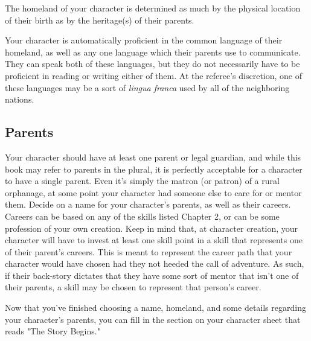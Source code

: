 \documentclass[oneside]{book}
\begin{document}
\begin{multicols}{2}
The homeland of your character is determined as much by the physical location of their birth as by the heritage(s) of their parents. 

Your character is automatically proficient in the common language of their homeland, as well as any one language which their parents use to communicate. They can speak both of these languages, but they do not necessarily have to be proficient in reading or writing either of them. At the referee's discretion, one of these languages may be a sort of \emph{lingua franca} used by all of the neighboring nations. 

\subsection{Parents}
Your character should have at least one parent or legal guardian, and while this book may refer to parents in the plural, it is perfectly acceptable for a character to have a single parent. Even it's simply the matron (or patron) of a rural orphanage, at some point your character had someone else to care for or mentor them. Decide on a name for your character's parents, as well as their careers. Careers can be based on any of the skills listed Chapter 2, or can be some profession of your own creation. Keep in mind that, at character creation, your character will have to invest at least one skill point in a skill that represents one of their parent's careers. This is meant to represent the career path that your character would have chosen had they not heeded the call of adventure. As such, if their back-story dictates that they have some sort of mentor that isn't one of their parents, a skill may be chosen to represent that person's career.

Now that you've finished choosing a name, homeland, and some details regarding your character's parents, you can fill in the section on your character sheet that reads "The Story Begins."


\end{multicols}
\end{document}
